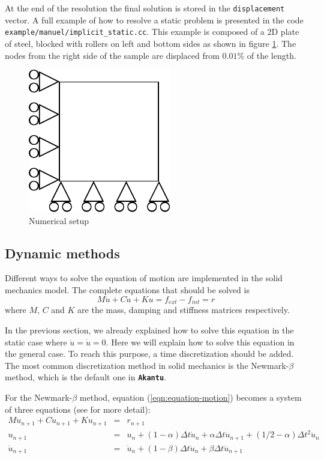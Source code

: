 \documentclass[a4paper,11pt]{book}
\newcommand{\akantu}{\texttt{\textbf{Akantu}}\xspace}
\newcommand{\code}[1]{\texttt{#1}}
\begin{document}
At  the   end  of  the   resolution  the  final   solution  is  stored   in  the
\code{displacement} vector.  A  full example of how to  resolve a static problem
is  presented  in   the  code  \code{example/manuel/implicit\_static.cc}.   This
example is  composed of a 2D  plate of steel,  blocked with rollers on  left and
bottom sides as  shown in figure \ref{fig:smm:static}. The  nodes from the right
side of the sample are displaced from $0.01\%$ of the length.

\begin{figure}[!htb]
  \centering
  \includegraphics{figures/implicit_static}
  \caption{Numerical setup\label{fig:smm:static}}
\end{figure}


\subsection{Dynamic methods}

Different ways  to solve  the equation  of motion are  implemented in  the solid
mechanics model.  The complete equations that should be solved is
\begin{equation}\label{eqn:equation-motion}
M\ddot{u} + C\dot{u} + Ku = f_{ext} -f_{int} = r
\end{equation}
where  $M$,  $C$   and  $K$  are  the  mass,   damping  and  stiffness  matrices
respectively.

In the previous section, we already  explained how to solve this equation in the
static case where $\ddot{u}  = \dot{u} = 0$.  Here we will  explain how to solve
this equation in the general case.  To reach this purpose, a time discretization
should be added. The most common discretization method in solid mechanics is the
Newmark-$\beta$ method, which is the default one in \akantu.

For the  Newmark-$\beta$ method, equation  (\ref{eqn:equation-motion}) becomes a
system  of three  equations  (see \cite{curnier92a}  \cite{hughes-83a} for  more
detail):
\begin{eqnarray}
  M     \ddot{u}_{n+1}    +     C    \dot{u}_{n+1}     +    K     u_{n+1}    &=&
  r_{n+1} \label{eqn:equation-motion-discret} \\
  u_{n+1}  &=& u_{n}  + (1  - \alpha)  \Delta t  \dot{u}_{n} +  \alpha  \Delta t
  \dot{u}_{n+1}       +       (1/2        -       \alpha)       \Delta       t^2
  \ddot{u}_n \label{eqn:finite-difference-1}\\
  \dot{u}_{n+1}  &=& \dot{u}_{n} +  (1 -  \beta) \Delta  t \ddot{u}_{n}  + \beta
  \Delta t \ddot{u}_{n+1}\label{eqn:finite-difference-2}
\end{eqnarray}
\end{document}
